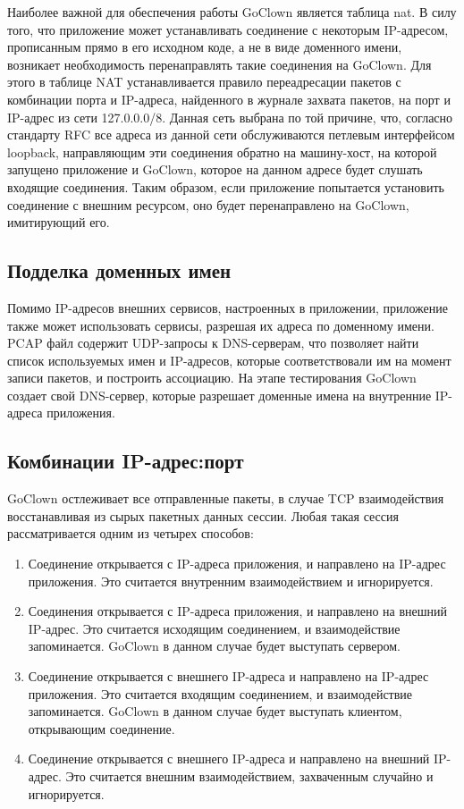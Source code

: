 Наиболее важной для обеспечения работы GoClown является таблица nat. В силу
того, что приложение может устанавливать соединение с некоторым IP-адресом,
прописанным прямо в его исходном коде, а не в виде доменного имени, возникает
необходимость перенаправлять такие соединения на GoClown. Для этого в таблице
NAT устанавливается правило переадресации пакетов с комбинации порта и IP-адреса,
найденного в журнале захвата пакетов, на порт и IP-адрес из сети 127.0.0.0/8.
Данная сеть выбрана по той причине, что, согласно стандарту RFC все адреса
из данной сети обслуживаются петлевым интерфейсом loopback, направляющим эти
соединения обратно на машину-хост, на которой запущено приложение \cite{rfc1122}
и GoClown, которое на данном адресе будет слушать входящие соединения.
Таким образом, если приложение попытается установить соединение с внешним
ресурсом, оно будет перенаправлено на GoClown, имитирующий его.

\subsection{Подделка доменных имен}
Помимо IP-адресов внешних сервисов, настроенных в приложении, приложение также
может использовать сервисы, разрешая их адреса по доменному имени. PCAP файл
содержит UDP-запросы к DNS-серверам, что позволяет найти список используемых
имен и IP-адресов, которые соответствовали им на момент записи пакетов,
и построить ассоциацию. На этапе тестирования GoClown создает свой DNS-сервер,
которые разрешает доменные имена на внутренние IP-адреса приложения.

\subsection{Комбинации IP-адрес:порт}
GoClown остлеживает все отправленные пакеты, в случае TCP взаимодействия
восстанавливая из сырых пакетных данных сессии. Любая такая сессия
рассматривается одним из четырех способов:
\begin{enumerate}
\item Соединение открывается с IP-адреса приложения, и направлено на IP-адрес
приложения. Это считается внутренним взаимодействием и игнорируется.  
\item Соединения открывается с IP-адреса приложения, и направлено на внешний
IP-адрес. Это считается исходящим соединением, и взаимодействие запоминается.
GoClown в данном случае будет выступать сервером.  
\item Соединение открывается с внешнего IP-адреса и направлено на IP-адрес
приложения. Это считается входящим соединением, и взаимодействие запоминается.
GoClown в данном случае будет выступать клиентом, открывающим соединение.  
\item Соединение открывается с внешнего IP-адреса и направлено на внешний
IP-адрес. Это считается внешним взаимодействием, захваченным случайно и
игнорируется.
\end{enumerate}

